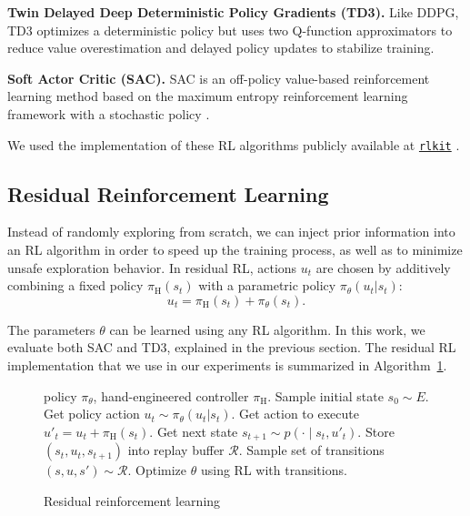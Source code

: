 \textbf{Twin Delayed Deep Deterministic Policy Gradients (TD3).} 
Like DDPG, TD3 optimizes a deterministic policy \cite{fujimoto2018td3} but uses two Q-function approximators to reduce value overestimation \cite{vanhasselt2016doubledqn} and delayed policy updates to stabilize training.

\textbf{Soft Actor Critic (SAC).}
SAC is an off-policy value-based reinforcement learning method based on the maximum entropy reinforcement learning framework with a stochastic policy \cite{haarnoja2018sac}.

We used the implementation of these RL algorithms publicly available at \href{https://github.com/vitchyr/rlkit}{\texttt{rlkit}} \cite{pong2018tdm}.

\subsection{Residual Reinforcement Learning}

Instead of randomly exploring from scratch, we can inject prior information into an RL algorithm in order to speed up the training process, as well as to minimize unsafe exploration behavior. In residual RL, actions $u_t$ are chosen by additively combining a fixed policy $\pi_\text{H}(s_t)$ with a parametric policy $\pi_\theta(u_t|s_t)$:
\begin{equation}\label{eq:ctrl_seq}
    u_t = \pi_\text{H}(s_t) + \pi_\theta(s_t).
\end{equation}

The parameters $\theta$ can be learned using any RL algorithm. In this work, we evaluate both SAC and TD3, explained in the previous section. The residual RL implementation that we use in our experiments is summarized in Algorithm~\ref{alg:residualrl}.


\begin{figure}
    \begin{algorithm}[H]
       	\caption{Residual reinforcement learning}
       	\label{alg:residualrl}
       	\begin{algorithmic}[1]
        \REQUIRE policy $\pi_\theta$, hand-engineered controller $\pi_\text{H}$.
            \STATE Sample initial state $s_0 \sim E$.
                \STATE Get policy action $u_t \sim \pi_\theta(u_t|s_t)$.
                \STATE Get action to execute $u'_t = u_t + \pi_\text{H}(s_t)$.
                \STATE Get next state $s_{t+1} \sim p(\cdot \mid s_t, u'_t)$.
                \STATE Store $(s_t, u_t, s_{t+1})$ into replay buffer $\mathcal R$.
                \STATE Sample set of transitions $(s, u, s') \sim \mathcal R$.
                \STATE Optimize $\theta$ using RL with transitions.
            \ENDFOR
        \ENDFOR
       	\end{algorithmic}
    \end{algorithm}
    \vspace{1cm}
\end{figure}


